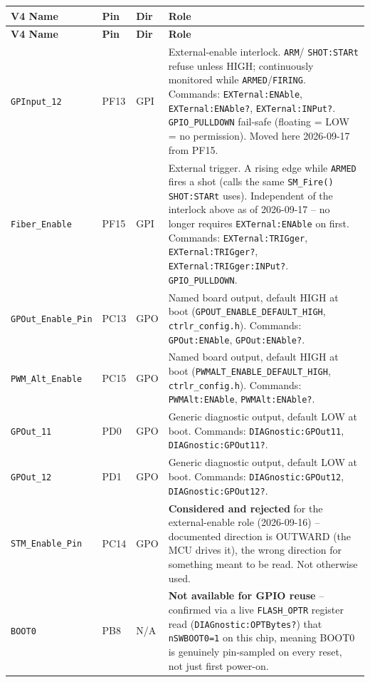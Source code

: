 \documentclass[11pt]{article}
\newcommand{\code}[1]{\texttt{#1}}
\begin{document}
\begin{longtable}{p{1.0in} p{0.5in} p{0.55in} p{2.6in}}
  \hline
  \textbf{V4 Name} & \textbf{Pin} & \textbf{Dir} & \textbf{Role} \\
  \hline
  \endfirsthead
  \hline
  \textbf{V4 Name} & \textbf{Pin} & \textbf{Dir} & \textbf{Role} \\
  \hline
  \endhead
  \code{GPInput\_12} & PF13 & GPI & External-enable interlock. \code{ARM}/
    \code{SHOT:STARt} refuse unless HIGH; continuously monitored
    while \code{ARMED}/\code{FIRING}. Commands: \code{EXTernal:ENAble},
    \code{EXTernal:ENAble?}, \code{EXTernal:INPut?}. \code{GPIO\_PULLDOWN}
    fail-safe (floating = LOW = no permission). Moved here 2026-09-17
    from PF15. \\
  \code{Fiber\_Enable} & PF15 & GPI & External trigger. A rising edge
    while \code{ARMED} fires a shot (calls the same \code{SM\_Fire()}
    \code{SHOT:STARt} uses). Independent of the interlock above
    as of 2026-09-17 -- no longer requires \code{EXTernal:ENAble} on
    first. Commands: \code{EXTernal:TRIGger}, \code{EXTernal:TRIGger?},
    \code{EXTernal:TRIGger:INPut?}. \code{GPIO\_PULLDOWN}. \\
  \code{GPOut\_Enable\_Pin} & PC13 & GPO & Named board output, default
    HIGH at boot (\code{GPOUT\_ENABLE\_DEFAULT\_HIGH},
    \code{ctrlr\_config.h}). Commands: \code{GPOut:ENAble},
    \code{GPOut:ENAble?}. \\
  \code{PWM\_Alt\_Enable} & PC15 & GPO & Named board output, default
    HIGH at boot (\code{PWMALT\_ENABLE\_DEFAULT\_HIGH},
    \code{ctrlr\_config.h}). Commands: \code{PWMAlt:ENAble},
    \code{PWMAlt:ENAble?}. \\
  \code{GPOut\_11} & PD0 & GPO & Generic diagnostic output, default LOW
    at boot. Commands: \code{DIAGnostic:GPOut11},
    \code{DIAGnostic:GPOut11?}. \\
  \code{GPOut\_12} & PD1 & GPO & Generic diagnostic output, default LOW
    at boot. Commands: \code{DIAGnostic:GPOut12},
    \code{DIAGnostic:GPOut12?}. \\
  \code{STM\_Enable\_Pin} & PC14 & GPO & \textbf{Considered and
    rejected} for the external-enable role (2026-09-16) -- documented
    direction is OUTWARD (the MCU drives it), the wrong direction for
    something meant to be read. Not otherwise used. \\
  \code{BOOT0} & PB8 & N/A & \textbf{Not available for GPIO reuse} --
    confirmed via a live \code{FLASH\_OPTR} register read
    (\code{DIAGnostic:OPTBytes?}) that \code{nSWBOOT0=1} on this chip,
    meaning BOOT0 is genuinely pin-sampled on every reset, not just
    first power-on. \\
  \hline
\end{longtable}
\end{document}
